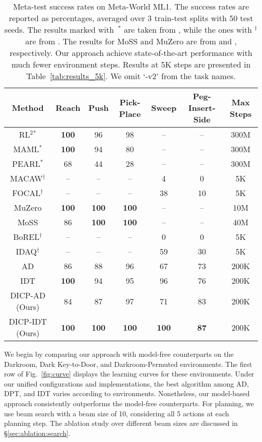 \documentclass{article}
\begin{document}
\begin{table}[t]
    \caption{Meta-test success rates on Meta-World ML1.
    The success rates are reported as percentages, averaged over 3 train-test splits with 50 test seeds.
    The results marked with~$^*$ are taken from \citet{MW}, while the ones with $^\dag$ are from \citet{IDAQ}.
    The results for MoSS and MuZero are  from \citet{MoSS} and \cite{ProcGenMuZero}, respectively.
    Our approach achieve state-of-the-art performance with much fewer environment steps.
    Results at 5K steps are presented in Table~\ref{tab:results_5k}.
    We omit `-v2' from the task names.
    }
    \label{tab:results}
    \small \centering
    \begin{tabular}{ccccccc}
    \toprule
    Method & Reach & Push & Pick-Place & Sweep & Peg-Insert-Side & Max Steps\\
    \midrule
    RL$^2$$^*$ & \textbf{100} & 96 & 98 & -- & -- & 300M\\
    MAML$^*$ & \textbf{100} & 94 & 80 & --  & -- & 300M\\
    PEARL$^*$ & 68 & 44 & 28 & -- & -- & 300M\\
    MACAW$^\dag$ & -- & -- & -- & 4 & 0 & 5K\\
    FOCAL$^\dag$ & -- & -- & -- & 38 & 10 & 5K\\
    \midrule
    MuZero & \textbf{100} & \textbf{100} & \textbf{100} & -- & -- & 10M\\
    MoSS & 86 & \textbf{100} & \textbf{100} & -- & -- & 40M\\
    BoREL$^\dag$ & -- & -- & -- & 0 & 0 & 5K\\
    IDAQ$^\dag$ & -- & -- & -- & 59 & 30 & 5K\\
    \midrule
    AD & 86 & 88 & 96 & 67 & 73 & 200K\\
    IDT & \textbf{100} & 94 & 95 & 96 & 76 & 200K\\
    \midrule
    DICP-AD (Ours) & 84 & 87 & 97 & 71 & 83 & 200K\\
    DICP-IDT (Ours) & \textbf{100} & \textbf{100} & \textbf{100} & \textbf{100} & \textbf{87} & 200K \\
    \bottomrule
    \end{tabular}
\end{table}

We begin by comparing our approach with model-free counterparts on the Darkroom, Dark Key-to-Door, and Darkroom-Permuted environments.
The first row of Fig.~\ref{fig:curve} displays the learning curves for these environments.
Under our unified configurations and implementations, the best algorithm among AD, DPT, and IDT varies according to environments.
Nonetheless, our model-based approach consistently outperforms the model-free counterparts.
For planning, we use beam search with a beam size of 10, considering all 5 actions at each planning step.
The ablation study over different beam sizes are discussed in \S\ref{sec:ablation:search}.
\end{document}
